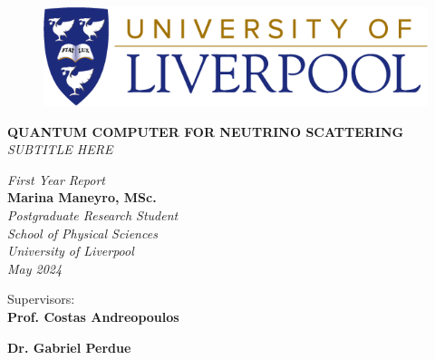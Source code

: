 
\changefontsizes{13pt}

\begin{titlepage}

\clearpage
{}
\begin{figure}[ht]
	\centering
    \includegraphics[scale=0.33]{UoL - Logo - CMYK.png}
\end{figure}
\vspace{2mm}

\begin{center}

    \LARGE{\textbf{\uppercase{Quantum Computer for Neutrino Scattering}}} \\    \vspace{2mm}
    \large{\textit{\uppercase{Subtitle here}}}
    
	\vspace{10mm}
	\large {\textit{First Year Report}}\\
	\Large{\textbf{Marina Maneyro, MSc.}}\\
	\vspace{5mm}
	\textit{\normalsize Postgraduate Research Student\\ School of Physical Sciences \\
    \normalsize{University of Liverpool}\\May 2024}
\end{center}
\vspace{30mm}


\begin{center}
    \normalsize{Supervisors:}\vspace{3mm}
	\\ \large{\textbf{Prof. Costas Andreopoulos}}\\
	
 	\vspace{2mm}
 	
	\large{\textbf{Dr. Gabriel Perdue}}


\end{center}
\end{titlepage}
